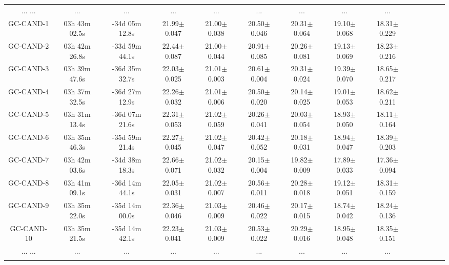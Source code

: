 \documentclass[fleqn,usenatbib]{mnras}
\begin{document}
\begin{table*}
\begin{tabular}{ cccccccccccccc }
... ... & ... & ... & ... & ... & ... & ... & ... & ... \\

GC-CAND-1 & 03h 43m 02.5s & -34d 05m 12.8s & 21.99$\pm$0.047 & 21.00$\pm$0.038 & 20.50$\pm$0.046 & 20.31$\pm$0.064 & 19.10$\pm$0.068 & 18.31$\pm$0.229  \\ 
GC-CAND-2 & 03h 42m 26.8s & -33d 59m 44.1s & 22.44$\pm$0.087 & 21.00$\pm$0.044 & 20.91$\pm$0.085 & 20.26$\pm$0.081 & 19.13$\pm$0.069 & 18.23$\pm$0.216  \\ 
GC-CAND-3 & 03h 39m 47.6s & -36d 35m 32.7s & 22.03$\pm$0.025 & 21.01$\pm$0.003 & 20.61$\pm$0.004 & 20.31$\pm$0.024 & 19.39$\pm$0.070 & 18.65$\pm$0.217  \\ 
GC-CAND-4 & 03h 37m 32.5s & -36d 27m 12.9s & 22.26$\pm$0.032 & 21.01$\pm$0.006 & 20.50$\pm$0.020 & 20.14$\pm$0.025 & 19.01$\pm$0.053 & 18.62$\pm$0.211  \\ 
GC-CAND-5 & 03h 31m 13.4s & -36d 07m 21.6s & 22.31$\pm$0.053 & 21.02$\pm$0.059 & 20.26$\pm$0.041 & 20.03$\pm$0.054 & 18.93$\pm$0.050 & 18.11$\pm$0.164  \\ 
GC-CAND-6 & 03h 35m 46.3s & -35d 59m 21.4s & 22.27$\pm$0.045 & 21.02$\pm$0.047 & 20.42$\pm$0.052 & 20.18$\pm$0.031 & 18.94$\pm$0.047 & 18.39$\pm$0.203  \\ 
GC-CAND-7 & 03h 42m 03.6s & -34d 38m 18.3s & 22.66$\pm$0.071 & 21.02$\pm$0.032 & 20.15$\pm$0.004 & 19.82$\pm$0.009 & 17.89$\pm$0.033 & 17.36$\pm$0.094  \\ 
GC-CAND-8 & 03h 41m 09.1s & -36d 14m 44.1s & 22.05$\pm$0.031 & 21.02$\pm$0.007 & 20.56$\pm$0.011 & 20.28$\pm$0.018 & 19.12$\pm$0.051 & 18.31$\pm$0.159  \\ 
GC-CAND-9 & 03h 35m 22.0s & -35d 14m 00.0s & 22.36$\pm$0.046 & 21.03$\pm$0.009 & 20.46$\pm$0.022 & 20.17$\pm$0.015 & 18.74$\pm$0.042 & 18.24$\pm$0.136  \\ 
GC-CAND-10 & 03h 35m 21.5s & -35d 14m 42.1s & 22.23$\pm$0.041 & 21.03$\pm$0.009 & 20.53$\pm$0.022 & 20.29$\pm$0.016 & 18.95$\pm$0.048 & 18.35$\pm$0.151  \\ 
 

... ... & ... & ... & ... & ... & ... & ... & ... & ... \\
\hline
\label{ucdgccat}
\end{tabular}
\end{table*}
\end{document}
